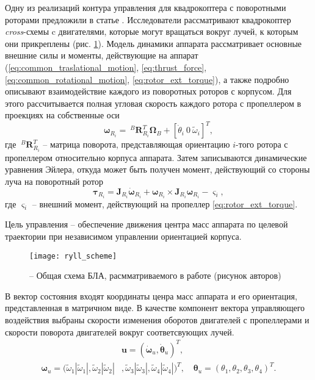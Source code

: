 Одну из реализаций контура управления для квадрокоптера с поворотными роторами предложили в статье \cite{Ryll01}. Исследователи рассматривают квадрокоптер \textit{cross}-схемы c двигателями, которые могут вращаться вокруг лучей, к которым они прикреплены (рис. \ref{fig:ryll_scheme}). Модель динамики аппарата рассматривает основные внешние силы и моменты, действующие на аппарат (\ref{eq:common_traslational_motion}, \ref{eq:thrust_force}, \ref{eq:common_rotational_motion}, \ref{eq:rotor_ext_torque}), а также подробно описывают взаимодействие каждого из поворотных роторов с корпусом. Для этого рассчитывается полная угловая скорость каждого ротора с пропеллером в проекциях на собственные оси
\begin{equation}
\bm{\omega}_{R_i} = ~^B\bm{R}_{R_i}^T \bm \Omega_B + [\dot{\theta}_i \ 0 \ \tilde \omega_i]^T,
\end{equation}
где $~^B\bm{R}_{R_i}^T$ -- матрица поворота, представляющая ориентацию $i$-того ротора с пропеллером
относительно корпуса аппарата.
Затем записываются динамические уравнения Эйлера, откуда может быть получен момент, действующий со стороны луча на поворотный ротор
\begin{equation}
\bm{\tau}_{R_i} = \bm J_{R_i} \dot{\bm \omega}_{R_i} +
{\bm \omega}_{R_i} \times \bm J_{R_i} {\bm \omega}_{R_i} - \bm \varsigma_i,
\end{equation}
где $\bm \varsigma_i$ -- внешний момент, действующий на пропеллер \eqref{eq:rotor_ext_torque}.

Цель управления -- обеспечение движения центра масс аппарата по целевой траектории при независимом управлении ориентацией корпуса. 
\begin{figure}[h!]
	\centering
	\texttt{[image: ryll\_scheme]}
	\caption{ -- Общая схема БЛА, расмматриваемого в работе \cite{Ryll01} (рисунок авторов)}
 	\label{fig:ryll_scheme}
\end{figure}

В вектор состояния входят координаты ценра масс аппарата и его ориентация, представленная в матричном виде.
В качестве компонент вектора управляющего воздействия выбраны скорости изменения оборотов двигателей с пропеллерами и скорости поворота двигателей вокруг соответсвующих лучей.
\begin{equation} \label{eq:ryll_ctrl_out}
\begin{aligned}
&\bm{u} = (\dot{\bm \omega}_u,  \dot{\bm \theta}_u)^T,
\\
\bm \omega_u =
(\tilde\omega_1 |\tilde\omega_1|,
\tilde\omega_2 |\tilde\omega_2|&,
\tilde\omega_3 |\tilde\omega_3|,
\tilde\omega_4 |\tilde\omega_4|)^T,
\quad
{\bm \theta}_u = (\theta_1, \theta_2 , \theta_3 , \theta_4 )^T.
\end{aligned}
\end{equation}

